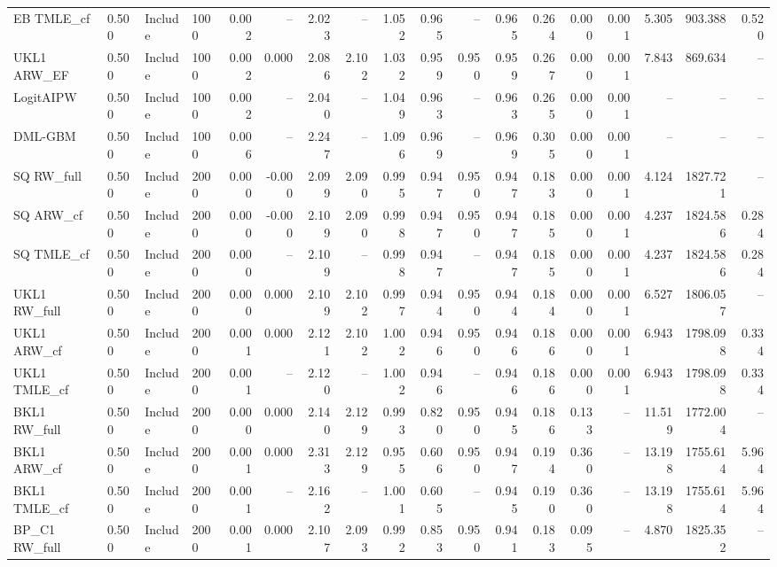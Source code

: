 \begin{tabular}{llllrrrrrrrrrrrrrr}
EB TMLE\_cf & 0.500 & Include & 1000 & 0.002 & -- & 2.023 & -- & 1.052 & 0.965 & -- & 0.965 & 0.264 & 0.000 & 0.001 & 5.305 & 903.388 & 0.520 \\
UKL1 ARW\_EF & 0.500 & Include & 1000 & 0.002 & 0.000 & 2.086 & 2.102 & 1.032 & 0.959 & 0.950 & 0.959 & 0.267 & 0.000 & 0.001 & 7.843 & 869.634 & -- \\
LogitAIPW & 0.500 & Include & 1000 & 0.002 & -- & 2.040 & -- & 1.049 & 0.963 & -- & 0.963 & 0.265 & 0.000 & 0.001 & -- & -- & -- \\
DML-GBM & 0.500 & Include & 1000 & 0.006 & -- & 2.247 & -- & 1.096 & 0.969 & -- & 0.969 & 0.305 & 0.000 & 0.001 & -- & -- & -- \\
SQ RW\_full & 0.500 & Include & 2000 & 0.000 & -0.000 & 2.099 & 2.090 & 0.995 & 0.947 & 0.950 & 0.947 & 0.183 & 0.000 & 0.001 & 4.124 & 1827.721 & -- \\
SQ ARW\_cf & 0.500 & Include & 2000 & 0.000 & -0.000 & 2.109 & 2.090 & 0.998 & 0.947 & 0.950 & 0.947 & 0.185 & 0.000 & 0.001 & 4.237 & 1824.586 & 0.284 \\
SQ TMLE\_cf & 0.500 & Include & 2000 & 0.000 & -- & 2.109 & -- & 0.998 & 0.947 & -- & 0.947 & 0.185 & 0.000 & 0.001 & 4.237 & 1824.586 & 0.284 \\
UKL1 RW\_full & 0.500 & Include & 2000 & 0.000 & 0.000 & 2.109 & 2.102 & 0.997 & 0.944 & 0.950 & 0.944 & 0.184 & 0.000 & 0.001 & 6.527 & 1806.057 & -- \\
UKL1 ARW\_cf & 0.500 & Include & 2000 & 0.001 & 0.000 & 2.121 & 2.102 & 1.002 & 0.946 & 0.950 & 0.946 & 0.186 & 0.000 & 0.001 & 6.943 & 1798.098 & 0.334 \\
UKL1 TMLE\_cf & 0.500 & Include & 2000 & 0.001 & -- & 2.120 & -- & 1.002 & 0.946 & -- & 0.946 & 0.186 & 0.000 & 0.001 & 6.943 & 1798.098 & 0.334 \\
BKL1 RW\_full & 0.500 & Include & 2000 & 0.000 & 0.000 & 2.140 & 2.129 & 0.993 & 0.820 & 0.950 & 0.945 & 0.186 & 0.133 & -- & 11.519 & 1772.004 & -- \\
BKL1 ARW\_cf & 0.500 & Include & 2000 & 0.001 & 0.000 & 2.313 & 2.129 & 0.955 & 0.606 & 0.950 & 0.947 & 0.194 & 0.360 & -- & 13.198 & 1755.614 & 5.964 \\
BKL1 TMLE\_cf & 0.500 & Include & 2000 & 0.001 & -- & 2.162 & -- & 1.001 & 0.605 & -- & 0.945 & 0.190 & 0.360 & -- & 13.198 & 1755.614 & 5.964 \\
BP\_C1 RW\_full & 0.500 & Include & 2000 & 0.001 & 0.000 & 2.107 & 2.093 & 0.992 & 0.853 & 0.950 & 0.941 & 0.183 & 0.095 & -- & 4.870 & 1825.352 & -- \\

\end{tabular}
